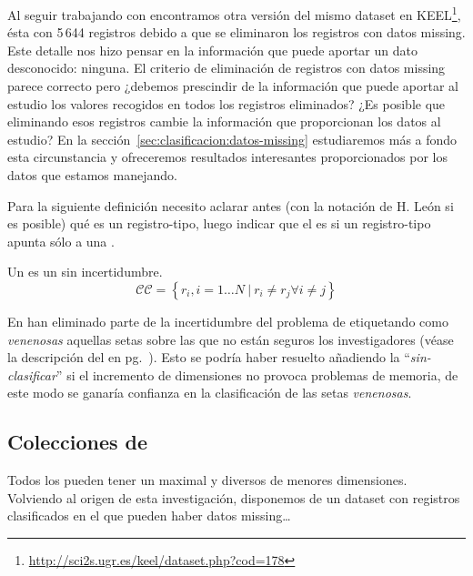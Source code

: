 Al seguir trabajando con \mushroom encontramos otra versión del mismo dataset en KEEL\footnote{\url{http://sci2s.ugr.es/keel/dataset.php?cod=178}}, ésta con 5\,644 registros debido a que se eliminaron los registros con datos missing. Este detalle nos hizo pensar en la información que puede aportar un dato desconocido: ninguna. El criterio de eliminación de registros con datos missing parece correcto pero ¿debemos prescindir de la información que puede aportar al estudio los valores recogidos en todos los registros eliminados? ¿Es posible que eliminando esos registros cambie la información que proporcionan los datos al estudio? En la sección~\ref{sec:clasificacion:datos-missing} estudiaremos más a fondo esta circunstancia y ofreceremos resultados interesantes proporcionados por los datos que estamos manejando.



Para la siguiente definición necesito aclarar antes (con la notación de H. León si es posible) qué es un registro-tipo, luego indicar que el \catalogo es \CC si un registro-tipo apunta sólo a una \clase.

\begin{Definition}[\CC] Un \CC es un \catalogo sin incertidumbre.
   $$\mathcal{CC} = \left\{r_i, i = 1\ldots N\ | \ r_i \neq r_j \forall i \neq j\right\}$$
\label{def:catalogo-completo}
\end{Definition}

En \mushroom han eliminado parte de la incertidumbre del problema de \clasificacion etiquetando como \emph{venenosas} aquellas setas sobre las que no están seguros los investigadores (véase la descripción del \dataset en pg.~\pageref{cita:incertidumbre-suprimida-en-mushroom}). Esto se podría haber resuelto añadiendo la \clase "`\emph{sin-clasificar}"' si el incremento de dimensiones no provoca problemas de memoria, de este modo se ganaría confianza en la clasificación de las setas \emph{venenosas}.







\subsection{Colecciones de \CCs}
\label{sec:clasificacion:catalogo-completo:colecciones}
%

Todos los \CCs pueden tener un \CC maximal y diversos \CCs de menores dimensiones. Volviendo al origen de esta investigación, disponemos de un dataset con registros clasificados en el que pueden haber datos missing\ldots 
